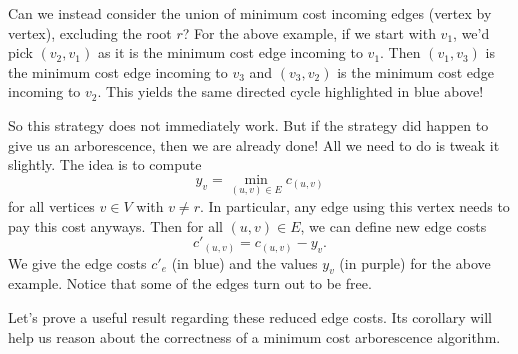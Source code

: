 Can we instead consider the union of minimum cost incoming edges 
(vertex by vertex), excluding the root $r$? For the above example, 
if we start with $v_1$, we'd pick $(v_2, v_1)$ as it is the minimum cost 
edge incoming to $v_1$. Then $(v_1, v_3)$ is the minimum cost edge 
incoming to $v_3$ and $(v_3, v_2)$ is the minimum cost edge incoming to 
$v_2$. This yields the same directed cycle highlighted in blue above!

So this strategy does not immediately work. But if the strategy 
did happen to give us an arborescence, then we are already done! 
All we need to do is tweak it slightly. The idea is to compute 
\[ y_v = \min_{(u,v)\in E} c_{(u, v)} \] 
for all vertices $v \in V$ with $v \neq r$. In particular, any edge using this 
vertex needs to pay this cost anyways. Then for all $(u, v) \in E$, we can 
define new edge costs 
\[ c'_{(u, v)} = c_{(u, v)} - y_v. \] 
We give the edge costs $c'_e$ (in blue) and the values $y_v$ (in purple) for the above example.
Notice that some of the edges turn out to be free.
\begin{center}
\end{center}
\vspace{-0.25cm}
Let's prove a useful result regarding these reduced edge costs. Its corollary 
will help us reason about the correctness of a minimum cost arborescence 
algorithm. 

